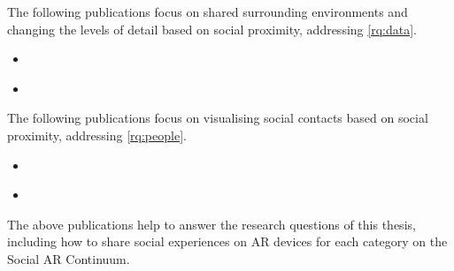 The following publications focus on shared surrounding environments and changing the levels of detail based on social proximity, addressing \ref{rq:data}.

\begin{itemize}
    \item{ }
    \item{ }
\end{itemize}

The following publications focus on visualising social contacts based on social proximity, addressing \ref{rq:people}. 

\begin{itemize}
    \item{ }
    \item{ }
\end{itemize}

The above publications help to answer the research questions of this thesis, including how to share social experiences on AR devices for each category on the Social AR Continuum. 
